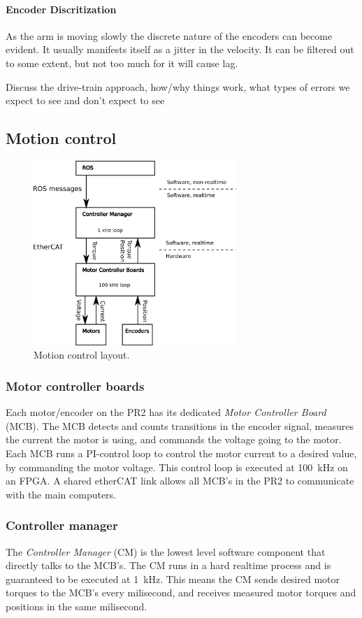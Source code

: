 \paragraph{Encoder Discritization}
As the arm is moving slowly the discrete nature of the encoders can
become evident.  It usually manifests itself as a jitter in the
velocity.  It can be filtered out to some extent, but not too much for
it will cause lag.



Discuss the drive-train approach, how/why things work, what types of errors we expect to see and don't expect to see

\subsection{Motion control}


\begin{figure}[h]
\centering
\includegraphics[width=290px]{images/mechanism_control.png}
\caption{Motion control layout.}
\label{fig:motion_control}
\end{figure}


\subsubsection{Motor controller boards}
Each motor/encoder on the PR2 has its dedicated \emph{Motor Controller
  Board} (MCB). The MCB detects and counts transitions in the encoder
signal, measures the current the motor is using, and commands the
voltage going to the motor. Each MCB runs a PI-control loop to control
the motor current to a desired value, by commanding the motor
voltage. This control loop is executed at 100~kHz on an FPGA.  A
shared etherCAT link allows all MCB's in the PR2 to communicate with
the main computers.

\subsubsection{Controller manager}
The \emph{Controller Manager} (CM) is the lowest level software
component that directly talks to the MCB's. The CM runs in a hard
realtime process and is guaranteed to be executed at 1~kHz. This means
the CM sends desired motor torques to the MCB's every milisecond, and
receives measured motor torques and positions in the same milisecond.

